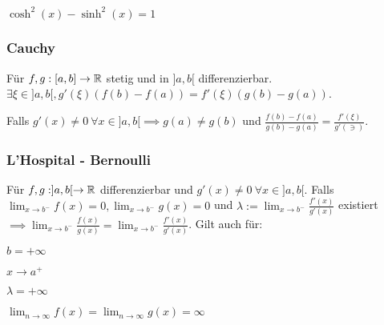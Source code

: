 \begin{compactenum}
\item $\cosh^2(x) - \sinh^2(x) = 1$
\end{compactenum}

\subsubsection{Cauchy}
Für $f, g: [a,b] \to \mathbb{R}$ stetig und in $]a,b[$ differenzierbar. $\exists \xi \in ]a,b[, g'(\xi)(f(b) - f(a)) = f'(\xi)(g(b)-g(a))$.
\begin{compactitem}
\item Falls $g'(x) \neq 0 \ \forall x \in ]a,b[ \implies g(a) \neq g(b)$ und $\frac{f(b) - f(a)}{g(b) - g(a)} = \frac{f'(\xi)}{g'(\ni)}$.
\end{compactitem}

\subsubsection{L'Hospital - Bernoulli}
Für $f,g: ]a,b[ \to \mathbb{R}$ differenzierbar und $g'(x) \neq 0 \ \forall x \in ]a,b[$. Falls $\lim_{x \to b^-} f(x) = 0, \lim_{x \to b^-} g(x) = 0$ und $\lambda := \lim_{x \to b^-} \frac{f'(x)}{g'(x)}$ existiert $\implies \lim_{x \to b^-} \frac{f(x)}{g(x)} = \lim_{x \to b^-} \frac{f'(x)}{g'(x)}$.\newline
Gilt auch für:
\begin{inparaitem}
    \item $b= +\infty$
    \item $x \to a^+$
    \item $\lambda = +\infty$
    \item $\lim_{n \to \infty} f(x) = \lim_{n \to \infty} g(x) = \infty$
\end{inparaitem}

